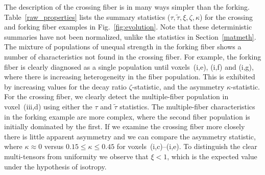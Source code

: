 \documentclass[dvips,aoas,preprint]{imsart}
\numberwithin{equation}{section}
\theoremstyle{plain}
\begin{document}
The description of the crossing fiber is in many ways simpler than the
forking.  Table~\ref{raw_properties} lists the summary statistics
($\tau,\tilde\tau,\xi,\zeta,\kappa$) for the crossing and forking
fiber examples in Fig.~\ref{fig:evolution}.  Note that these
deterministic summaries have not been normalized, unlike the
statistics in Section~\ref{matmeth}.  The mixture of populations of
unequal strength in the forking fiber shows a number of
characteristics not found in the crossing fiber.  For example, the
forking fiber is clearly diagnosed as a single population until
voxels~(i,e), (i,f) and (i,g), where there is increasing heterogeneity
in the fiber population.  This is exhibited by increasing values for
the decay ratio $\zeta$-statistic, and the asymmetry
$\kappa$-statistic.  For the crossing fiber, we clearly detect the
multiple-fiber population in voxel~(iii,d) using either the $\tau$ and
$\tilde\tau$ statistics.  The multiple-fiber characteristics in the
forking example are more complex, where the second fiber population is
initially dominated by the first.  If we examine the crossing fiber
more closely there is little apparent asymmetry and we can compare the
asymmetry statistic, where $\kappa\approx{0}$ versus
$0.15\leq{\kappa}\leq0.45$ for voxels~(i,c)--(i,e).  To distinguish
the clear multi-tensors from uniformity we observe that $\xi<1$, which
is the expected value under the hypothesis of isotropy.
\end{document}

